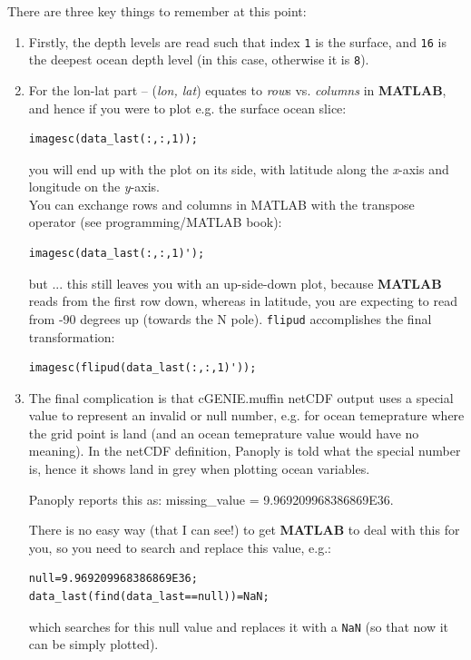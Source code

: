 \documentclass[11pt,fleqn]{book} %
\begin{document}
\vspace{2mm}
There are three key things to remember at this point:

\begin{enumerate}
\setlength{\itemindent}{.2in}

\vspace{2mm}\item Firstly, the depth levels are read such that index \texttt{1} is the surface, and \texttt{16} is the deepest ocean depth level (in this case, otherwise it is \texttt{8}).

\vspace{2mm}\item For the lon-lat part -- (\textit{lon, lat}) equates to \textit{row}\textit{}s vs. \textit{columns} in \textbf{MATLAB}, and hence if you were to plot e.g. the surface ocean slice:
\begin{verbatim}
imagesc(data_last(:,:,1));
\end{verbatim}
you will end up with the plot on its side, with latitude along the \textit{x}-axis and longitude on the \textit{y}-axis.
\\You can exchange rows and columns in MATLAB with the transpose operator (see programming/MATLAB book):
\begin{verbatim}
imagesc(data_last(:,:,1)');
\end{verbatim}
but ... this still leaves you with an up-side-down plot, because \textbf{MATLAB} reads from the first row down, whereas in latitude, you are expecting to read from -90 degrees up (towards the N pole). \texttt{flipud} accomplishes the final transformation:
\begin{verbatim}
imagesc(flipud(data_last(:,:,1)'));
\end{verbatim}

\vspace{2mm}\item The final complication is that cGENIE.muffin netCDF output uses a special value to represent an invalid or null number, e.g. for ocean temeprature where the grid point is land (and an ocean temeprature value would have no meaning). In the netCDF definition, Panoply is told what the special number is, hence it shows land in grey when plotting ocean variables.

Panoply reports this as: \textsf{\footnotesize missing\_value = 9.969209968386869E36}.

There is no easy way (that I can see!) to get \textbf{MATLAB} to deal with this for you, so you need to search and replace this value, e.g.:
\small\begin{verbatim}
null=9.969209968386869E36;
data_last(find(data_last==null))=NaN;
\end{verbatim}\normalsize
which searches for this null value and replaces it with a \texttt{NaN} (so that now it can be simply plotted).

\end{enumerate}
\vspace{2mm}
\end{document}
